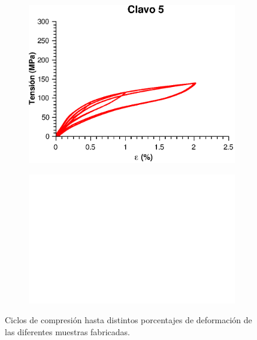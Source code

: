 \documentclass[a4paper,12pt,fleqn,twoside,openany]{book}
\begin{document}
\begin{figure}
    \newline
    \centering
        \begin{subfigure}{0.45\textwidth}
        \includegraphics[width=\textwidth]{Img/Resultados/clavos/Clavo5Comp.eps}
    \end{subfigure}
            \begin{subfigure}{0.45\textwidth}
        \includegraphics[width=\textwidth]{Img/Resultados/Resistencia/Ejblanco.jpg}
        \label{fig:EjTensionDef}
    \end{subfigure} 
    
    \caption{Ciclos de compresión hasta distintos porcentajes de deformación de las diferentes muestras fabricadas.}
 \label{fig: Clavos3y4}
    \end{figure}
\end{document}
